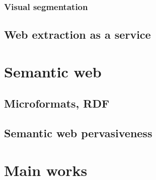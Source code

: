 \subsubsection{Visual segmentation}
\subsection{Web extraction as a service}
\section{Semantic web}
\subsection{Microformats, RDF}
\subsection{Semantic web pervasiveness}
\section{Main works}


